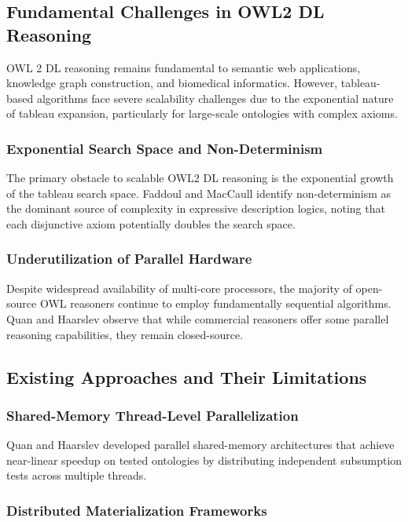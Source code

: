 \documentclass[preprint,12pt]{elsarticle}
\begin{document}
\subsection{Fundamental Challenges in OWL2 DL Reasoning}

OWL 2 DL reasoning remains fundamental to semantic web applications, knowledge graph construction, and biomedical informatics. However, tableau-based algorithms face severe scalability challenges due to the exponential nature of tableau expansion, particularly for large-scale ontologies with complex axioms.

\subsubsection{Exponential Search Space and Non-Determinism}

The primary obstacle to scalable OWL2 DL reasoning is the exponential growth of the tableau search space. Faddoul and MacCaull identify non-determinism as the dominant source of complexity in expressive description logics, noting that each disjunctive axiom potentially doubles the search space.

\subsubsection{Underutilization of Parallel Hardware}

Despite widespread availability of multi-core processors, the majority of open-source OWL reasoners continue to employ fundamentally sequential algorithms. Quan and Haarslev observe that while commercial reasoners offer some parallel reasoning capabilities, they remain closed-source.

\subsection{Existing Approaches and Their Limitations}

\subsubsection{Shared-Memory Thread-Level Parallelization}

Quan and Haarslev developed parallel shared-memory architectures that achieve near-linear speedup on tested ontologies by distributing independent subsumption tests across multiple threads.

\subsubsection{Distributed Materialization Frameworks}
\end{document}
